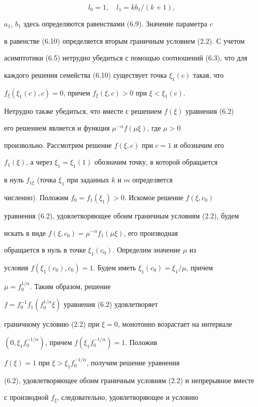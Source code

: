 $$ 


l_0=1,\quad l_1=k b_1/(k+1), 


$$ 


$a_1$, $b_1$ здесь определяются равенствами (6.9). Значение параметра $c$ 


в равенстве (6.10) определяется вторым граничным условием (2.2). С учетом 


асимптотики (6.5) нетрудно убедиться с помощью соотношений (6.3), что для 


каждого решения семейства (6.10) существует точка $\xi_1(c)$ такая, что 


$f_\xi(\xi_1(c),c)=0$, причем $f_\xi(\xi,c)>0$ при $\xi<\xi_1(c)$. 


Нетрудно также убедиться, что вместе с решением $f(\xi)$ уравнения (6.2) 


его решением является и функция $\mu^{-\alpha}f(\mu\xi)$, где $\mu>0$ 


произвольно. Рассмотрим решение $f(\xi,c)$ при $c=1$ и обозначим его 


$f_1(\xi)$, а через $\xi_1=\xi_1(1)$ обозначим точку, в которой обращается 


в нуль $f_{1\xi}$ (точка $\xi_1$ при заданных $k$ и $m$ определяется 


численно). Положим $f_0=f_1(\xi_1)>0$. Искомое решение $f(\xi,c_0)$ 


уравнения (6.2), удовлетворяющее обоим граничным условиям (2.2), будем 


искать в виде $f(\xi,c_0)=\mu^{-\alpha}f_1(\mu\xi)$, его производная 


обращается в нуль в точке $\xi_1(c_0)$. Определим значение $\mu$ из 


условия $f(\xi_1(c_0),c_0)=1$. Будем иметь $\xi_1(c_0)=\xi_1/\mu$, причем 


$\mu=f_0^{1/\alpha}$. Таким образом, решение 


$f=f_0^{-1}f_1(f_0^{1/\alpha}\xi)$ уравнения (6.2) удовлетворяет 


граничному условию (2.2) при $\xi=0$, монотонно возрастает на интервале 


$(0,\xi_1f_0^{-1/\alpha})$, причем $f(\xi_1f_0^{-1/\alpha})=1$. Положив 


$f(\xi)=1$ при $\xi>\xi_1f_0^{-1/\alpha}$, получим решение уравнения 


(6.2), удовлетворяющее обоим граничным условиям (2.2) и непрерывное вместе 


с производной $f_\xi$, следовательно, удовлетворяющее и условию 


